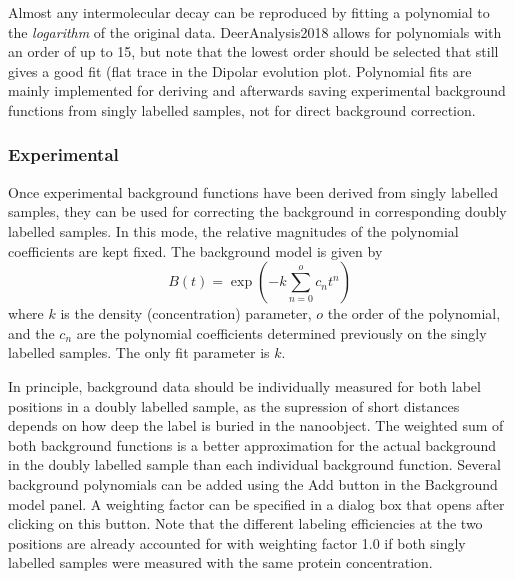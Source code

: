 \documentclass{article}
\begin{document}
Almost any intermolecular decay can be reproduced by fitting a polynomial to the \emph{logarithm} of the original data. DeerAnalysis2018 allows for polynomials with an order of up to 15, but note that the lowest order should be selected that still gives a good fit (flat trace in the {\ttfamily Dipolar evolution} plot. Polynomial fits are mainly implemented for deriving and afterwards saving experimental background functions from singly labelled samples, not for direct background correction.

\subsubsection{Experimental}
Once experimental background functions have been derived from singly labelled samples, they can be used for correcting the background in corresponding doubly labelled samples. In this mode, the relative magnitudes of the polynomial coefficients are kept fixed. The background model is given by
\begin{equation}
	B \left( t \right) = \exp \left( -k \sum _{n=0} ^o c_n t^n \right)
\end{equation}
where $k$ is the density (concentration) parameter, $o$ the order of the polynomial, and the $c_n$ are the polynomial coefficients determined previously on the singly labelled samples. The only fit parameter is $k$.

In principle, background data should be individually measured for both label positions in a doubly labelled sample, as the supression of short distances depends on how deep the label is buried in the nanoobject. The weighted sum of both background functions is a better approximation for the actual background in the doubly labelled sample than each individual background function. Several background polynomials can be added using the {\ttfamily Add} button in the {\ttfamily Background model} panel. A weighting factor can be specified in a dialog box that opens after clicking on this button. Note that the different labeling efficiencies at the two positions are already accounted for with weighting factor 1.0 if both singly labelled samples were measured with the same protein concentration. 
\end{document}
